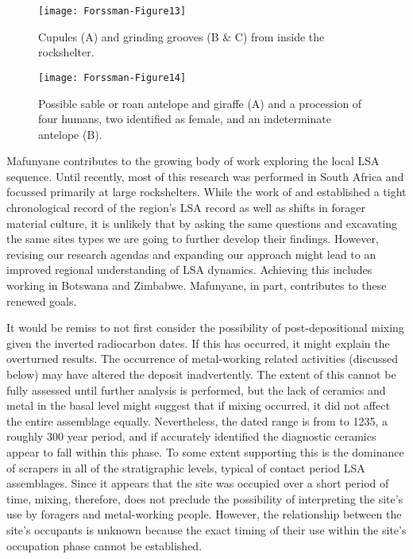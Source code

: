 	\begin{figure} %
		\texttt{[image: Forssman-Figure13]}
		\caption{Cupules (A) and grinding grooves (B \& C) from inside the rockshelter.}
		\label{fig:Forssman-Figure13}
	\end{figure}
	
	\begin{figure} %
		\texttt{[image: Forssman-Figure14]}
		\caption{Possible sable or roan antelope and giraffe (A) and a procession of four humans, two identified as female, and an indeterminate antelope (B).}
		\label{fig:Forssman-Figure14}
	\end{figure}


Mafunyane contributes to the  growing body of work exploring the local LSA sequence. 
Until recently, most of this research was performed in South Africa and focussed primarily at large rockshelters. 
While the work of \textcite{Hall_2000} and \textcites{vanDoornum_2007}{vanDoornum_2008}{vanDoornum_2014} established a tight chronological record of the region’s LSA record as well as shifts in forager material culture, it is unlikely that by asking the same questions and excavating the same sites types we are going to further develop their findings. However, revising our research agendas and expanding our approach might lead to an improved regional understanding of LSA dynamics. Achieving this includes working in Botswana and Zimbabwe. Mafunyane, in part, contributes to these renewed goals. 

It would be remiss to not first consider the possibility of post-depositional mixing given the inverted radiocarbon dates. If this has occurred, it might explain the overturned results. The occurrence of metal-working related activities (discussed below) may have altered the deposit inadvertently. The extent of this cannot be fully assessed until further analysis is performed, but the lack of ceramics and metal in the basal level might suggest that if mixing occurred, it did not affect the entire assemblage equally. Nevertheless, the dated range is from  to 1235, a roughly 300 year period, and if accurately identified the diagnostic ceramics appear to fall within this phase. To some extent supporting this is the dominance of scrapers in all of the stratigraphic levels, typical of contact period LSA assemblages. Since it appears that the site was occupied over a short period of time, mixing, therefore, does not preclude the possibility of interpreting the site’s use by foragers and metal-working people. However, the relationship between the site’s occupants is unknown because the exact timing of their use within the site’s occupation phase cannot be established. 

